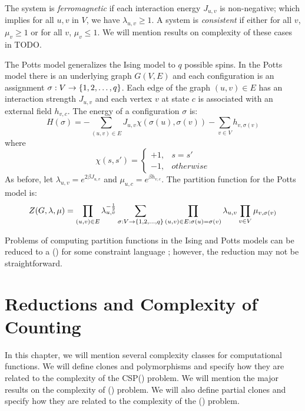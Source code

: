 The system is \emph{ferromagnetic} if each interaction energy \(J_{u,v}\) is non-negative; 
which implies for all \(u,v\) in \(V\), we have \(\lambda_{u,v} \ge 1\)\@.
A system is \emph{consistent} if
either for all \(v\), \(\mu_v\ge 1\) or for all \(v\), \(\mu_v \le 1\)\@. We will
mention results on complexity of these cases in TODO. 

The Potts model generalizes the Ising model to \(q\) possible spins.
In the Potts model there is an underlying graph \(G(V,E)\) and 
each configuration is an assignment \(\sigma:V\to \{{{1,2,\dotsc,q}}\}\)\@.
Each edge of the graph \((u,v)\in E\) has an interaction
strength \(J_{u,v}\) and each vertex \(v\) at state \(c\) is associated with an
external field \(h_{v,c}\)\@. The energy of a configuration $\sigma$ is:
\[H(\sigma)=-\sum_{(u,v)\in E} J_{u,v}\chi(\sigma(u),\sigma(v)) - \sum_{v\in V} 
h_{v,\sigma(v)}\]
where
\[\chi(s,s')=\begin{cases}+1, & s=s'\\-1, & otherwise\end{cases}\]
As before, let \(\lambda_{u,v}=e^{2\beta J_{u,v}}\) and
\(\mu_{u,c}=e^{\beta h_{v,c}}\)\@. The partition function for the Potts model is:
\[Z(G,\lambda,\mu)=\prod_{(u,v)\in E}\lambda_{u,v}^{-\frac{1}{2}}
\sum_{\sigma:V\to\{{{1,2,\dotsc,q}}\}} \prod_{(u,v)\in E:\sigma(u)=\sigma(v)}\lambda_{u,v}
\prod_{v\in V}\mu_{v,\sigma(v)}\]

Problems of computing partition functions in the Ising and Potts models can be
reduced to a \ccsp(\mrelset) for some constraint language \mrelset; however, the reduction
may not be straightforward.


\chapter{Reductions and Complexity of Counting}
In this chapter, we will mention several complexity classes for computational functions.
We will define clones and polymorphisms and specify how they are related to
the complexity of the CSP(\mrelset) problem. We will mention the major results on the complexity of 
\ccsp(\mrelset) problem. We will also define partial clones and specify
how they are related to the complexity of the \ccsp(\mrelset) problem.

